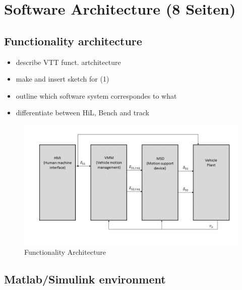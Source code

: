 \documentclass[ExampleMasters.tex]{subfiles}
\begin{document}
\clearpage


\chapter{Software Architecture (8 Seiten)}
\label{chap:software_setup}

\section{Functionality architecture}
\label{sec:func_architecture}

\begin{itemize}
	\item describe VTT funct. artchitecture
	\item make and insert sketch for (1)
	\item outline which software system correspondes to what
	\item differentiate between HiL, Bench and track
	
\end{itemize}
\begin{figure}[h]
\centering
\includegraphics[width=1\linewidth]{figures/functionality_architecture}

\caption{Functionality Architecture}
\label{fig:funct_architecture}
\end{figure}

\section{Matlab/Simulink environment}
\label{sec:matlab}

\end{document}
